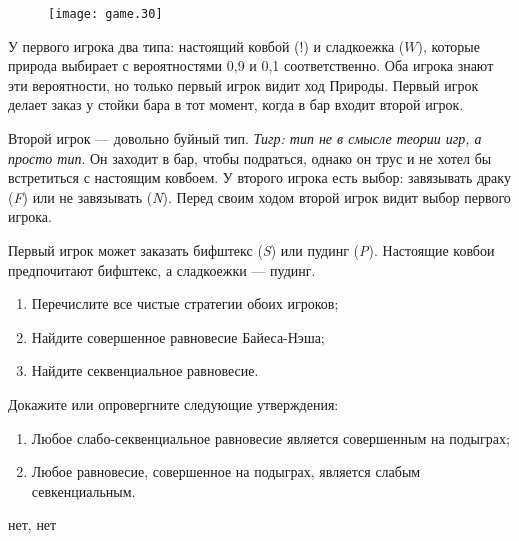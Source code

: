\begin{problem}

\begin{figure}[htbp]
     \texttt{[image: game.30]}
\end{figure}\par

У первого игрока два типа: настоящий ковбой ($!$) и сладкоежка ($W$), которые природа выбирает с вероятностями 0,9 и 0,1 соответственно. Оба игрока знают эти вероятности, но только первый игрок видит ход Природы. Первый игрок делает заказ у стойки бара в тот момент, когда в бар входит второй игрок.\par


Второй игрок — довольно буйный тип. {\it Тигр: тип не в смысле теории игр, а просто тип}. Он заходит в бар, чтобы подраться, однако он трус и не хотел бы встретиться с настоящим ковбоем. У второго игрока есть выбор: завязывать драку ({\it F}) или не завязывать ({\it N}). Перед своим ходом второй игрок видит выбор первого игрока.\par
Первый игрок может заказать бифштекс ({\it S}) или пудинг ({\it P}). Настоящие ковбои предпочитают бифштекс, а сладкоежки — пудинг.
\begin{enumerate}
\item Перечислите все чистые стратегии обоих игроков;\par
\item Найдите совершенное равновесие Байеса-Нэша;\par
\item Найдите секвенциальное равновесие.\par
\end{enumerate}


\begin{sol}

\end{sol}
\end{problem}



\begin{problem}
Докажите или опровергните следующие утверждения:

\begin{enumerate}
\item Любое слабо-секвенциальное равновесие является совершенным на подыграх;\par
\item  Любое равновесие, совершенное на подыграх, является слабым севкенциальным.
\end{enumerate}

\begin{sol}
нет, нет
\end{sol}
\end{problem}





